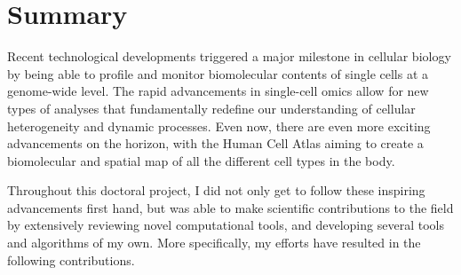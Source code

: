 
\newpage{\thispagestyle{empty}\cleardoublepage}

\newpage{\thispagestyle{empty}\cleardoublepage}
\tableofcontents 


\newpage{\thispagestyle{empty}\cleardoublepage}


\makenomenclature
\printnomenclature





\chapter*{Summary}
\vspace{-4em}
Recent technological developments triggered a major milestone in cellular biology by being able to profile and monitor biomolecular contents of single cells at a genome-wide level. The rapid advancements in single-cell omics allow for new types of analyses that fundamentally redefine our understanding of cellular heterogeneity and dynamic processes. Even now, there are even more exciting advancements on the horizon, with the Human Cell Atlas aiming to create a biomolecular and spatial map of all the different cell types in the body. 

Throughout this doctoral project, I did not only get to follow these inspiring advancements first hand, but was able to make scientific contributions to the field by extensively reviewing novel computational tools, and developing several tools and algorithms of my own. More specifically, my efforts have resulted in the following contributions.

